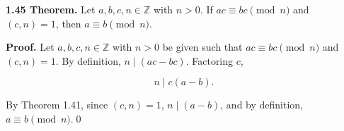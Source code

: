 \documentclass[12pt]{article}
\begin{document}
\noindent\textbf{1.45 Theorem.} Let $a,b,c,n\in\mathbb{Z}$ with $n>0$. If $ac\equiv bc\pmod{n}$ and $(c,n)=1$, then $a\equiv b\pmod{n}$.

\bigskip

\noindent\textbf{Proof.} Let $a,b,c,n\in\mathbb{Z}$ with $n>0$ be given such that $ac\equiv bc\pmod{n}$ and $(c,n)=1$. By definition, $n\mid (ac-bc)$. Factoring $c$,

\begin{equation*}
n\mid c(a-b).
\end{equation*}

\noindent By Theorem 1.41, since $(c,n)=1$, $n\mid (a-b)$, and by definition, $a\equiv b\pmod{n}$.\qed
\end{document}
